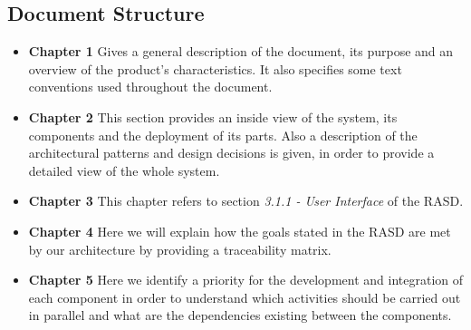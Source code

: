 \subsection{Document Structure}

\begin{itemize}
	\item \textbf{Chapter 1} 
	Gives a general description of the document, its purpose and an overview of the product's characteristics. It also specifies some text conventions used throughout the document.
	
	\item \textbf{Chapter 2}
	This section provides an inside view of the system, its components and the deployment of its parts.
	Also a description of the architectural patterns and design decisions is given, in order to provide a detailed view of the whole system.
	
	\item \textbf{Chapter 3}
	This chapter refers to section \textit{3.1.1 - User Interface} of the RASD.
	
	\item \textbf{Chapter 4}
	Here we will explain how the goals stated in the RASD are met by our architecture by providing a traceability matrix. 
	
	\item \textbf{Chapter 5}
	Here we identify a priority for the development and integration of each component in order to understand which activities should be carried out in parallel and what are the dependencies existing between the components.
\end{itemize}